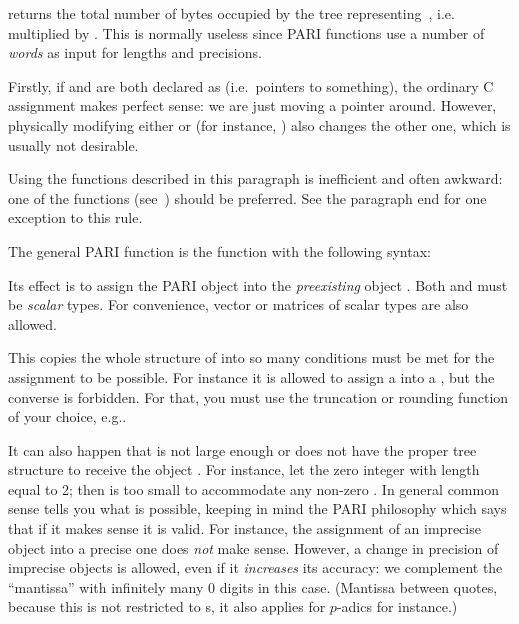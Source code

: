  returns the total number of bytes occupied
by the tree representing~, i.e.~ multiplied by
. This is normally useless since PARI functions use
a number of \emph{words} as input for lengths and precisions.

Firstly, if  and  are both declared as  (i.e.~pointers
to something), the ordinary C assignment  makes perfect sense: we
are just moving a pointer around. However, physically modifying either
 or  (for instance, ) also changes the other
one, which is usually not desirable. \label{se:assign}

 Using the functions described in this
paragraph is inefficient and often awkward: one of the 
functions (see~) should be preferred. See the paragraph
end for one exception to this rule.

\noindent
The general PARI  function is the function  with
the following syntax:


\noindent
Its effect is to assign the PARI object  into the \emph{preexisting}
object . Both  and  must be \emph{scalar} types. For
convenience, vector or matrices of scalar types are also allowed.

This copies the whole structure of  into  so many conditions
must be met for the assignment to be possible. For instance it is allowed to
assign a  into a , but the converse is forbidden. For
that, you must use the truncation or rounding function of your choice,
e.g..

It can also happen that  is not large enough or does not have the proper
tree structure to receive the object . For instance, let  the zero
integer with length equal to 2; then  is too small to accommodate any
non-zero . In general common sense tells you what is possible, keeping in
mind the PARI philosophy which says that if it makes sense it is valid. For
instance, the assignment of an imprecise object into a precise one does \emph{not}
make sense. However, a change in precision of imprecise objects is allowed, even
if it \emph{increases} its accuracy: we complement the ``mantissa'' with
infinitely many $0$ digits in this case. (Mantissa between quotes, because this
is not restricted to s, it also applies for $p$-adics for instance.)

